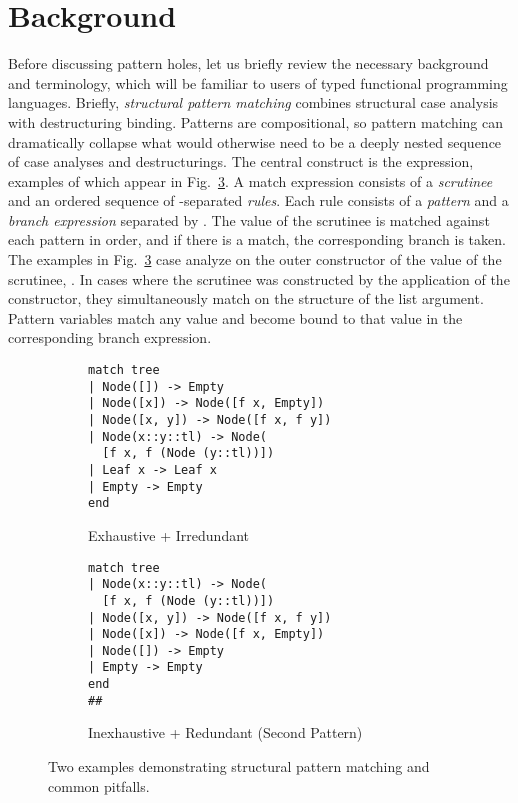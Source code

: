 \section{Background}
\label{sec:background}
Before discussing pattern holes, let us briefly review the necessary background and terminology, which will be familiar to users of typed functional programming languages. 
Briefly,
\emph{structural pattern matching} combines structural case analysis with destructuring binding. 
Patterns are compositional, so pattern matching can dramatically collapse what would otherwise 
need to be a deeply nested sequence of case analyses and destructurings. The central construct is the  expression, examples of which appear in  Fig.~\ref{fig:basic-examples}. A match expression consists of a \emph{scrutinee} and an ordered sequence of \li{|}-separated \emph{rules}. Each rule consists of a \emph{pattern} and a \emph{branch expression} separated by \li{->}. The value of the scrutinee is matched against each pattern in order, and if there is a match, the corresponding branch is taken. The examples in  Fig.~\ref{fig:basic-examples} 
case analyze on the outer constructor of the value of the {scrutinee}, . In cases where the scrutinee was constructed by the application of the  constructor, they simultaneously match on the structure of the list argument. Pattern variables match any value and become bound to that value in the corresponding branch expression.
\begin{figure}[h]
\begin{subfigure}{.45\textwidth}
\begin{lstlisting}[numbers=none]
match tree
| Node([]) -> Empty
| Node([x]) -> Node([f x, Empty])
| Node([x, y]) -> Node([f x, f y])
| Node(x::y::tl) -> Node(
  [f x, f (Node (y::tl))])
| Leaf x -> Leaf x
| Empty -> Empty
end
\end{lstlisting}
\caption{Exhaustive + Irredundant\label{fig:basic-examples-correct}}
\end{subfigure}
\begin{subfigure}{.5\textwidth}
\begin{lstlisting}[numbers=none]
match tree
| Node(x::y::tl) -> Node(
  [f x, f (Node (y::tl))])
| Node([x, y]) -> Node([f x, f y])
| Node([x]) -> Node([f x, Empty])
| Node([]) -> Empty
| Empty -> Empty
end
##
\end{lstlisting}
\caption{Inexhaustive + Redundant (Second Pattern)\label{fig:basic-examples-wrong}}
\end{subfigure}
\caption{Two examples demonstrating structural pattern matching and common pitfalls.}
\label{fig:basic-examples}
\end{figure}

